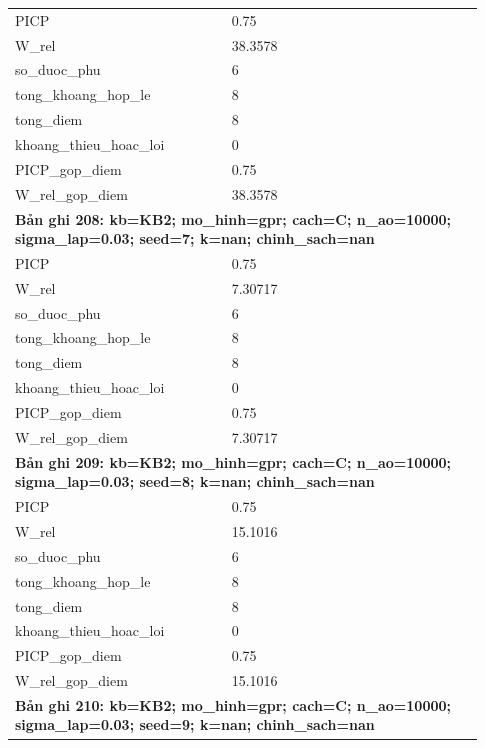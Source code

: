 \begin{longtable}{p{0.43\linewidth}p{0.50\linewidth}}
PICP & 0.75 \\
W\_\allowbreak rel & 38.3578 \\
so\_\allowbreak duoc\_\allowbreak phu & 6 \\
tong\_\allowbreak khoang\_\allowbreak hop\_\allowbreak le & 8 \\
tong\_\allowbreak diem & 8 \\
khoang\_\allowbreak thieu\_\allowbreak hoac\_\allowbreak loi & 0 \\
PICP\_\allowbreak gop\_\allowbreak diem & 0.75 \\
W\_\allowbreak rel\_\allowbreak gop\_\allowbreak diem & 38.3578 \\
\midrule
\multicolumn{2}{p{0.95\linewidth}}{\textbf{Bản ghi 208: kb=KB2; mo\_hinh=gpr; cach=C; n\_ao=10000; sigma\_lap=0.03; seed=7; k=nan; chinh\_sach=nan}} \\
PICP & 0.75 \\
W\_\allowbreak rel & 7.30717 \\
so\_\allowbreak duoc\_\allowbreak phu & 6 \\
tong\_\allowbreak khoang\_\allowbreak hop\_\allowbreak le & 8 \\
tong\_\allowbreak diem & 8 \\
khoang\_\allowbreak thieu\_\allowbreak hoac\_\allowbreak loi & 0 \\
PICP\_\allowbreak gop\_\allowbreak diem & 0.75 \\
W\_\allowbreak rel\_\allowbreak gop\_\allowbreak diem & 7.30717 \\
\midrule
\multicolumn{2}{p{0.95\linewidth}}{\textbf{Bản ghi 209: kb=KB2; mo\_hinh=gpr; cach=C; n\_ao=10000; sigma\_lap=0.03; seed=8; k=nan; chinh\_sach=nan}} \\
PICP & 0.75 \\
W\_\allowbreak rel & 15.1016 \\
so\_\allowbreak duoc\_\allowbreak phu & 6 \\
tong\_\allowbreak khoang\_\allowbreak hop\_\allowbreak le & 8 \\
tong\_\allowbreak diem & 8 \\
khoang\_\allowbreak thieu\_\allowbreak hoac\_\allowbreak loi & 0 \\
PICP\_\allowbreak gop\_\allowbreak diem & 0.75 \\
W\_\allowbreak rel\_\allowbreak gop\_\allowbreak diem & 15.1016 \\
\midrule
\multicolumn{2}{p{0.95\linewidth}}{\textbf{Bản ghi 210: kb=KB2; mo\_hinh=gpr; cach=C; n\_ao=10000; sigma\_lap=0.03; seed=9; k=nan; chinh\_sach=nan}} \\

\end{longtable}
